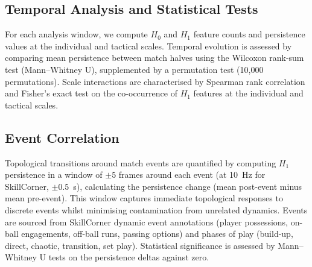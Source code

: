 \subsection{Temporal Analysis and Statistical Tests}

For each analysis window, we compute \(H_0\) and \(H_1\) feature counts and persistence values at the individual and tactical scales. Temporal evolution is assessed by comparing mean persistence between match halves using the Wilcoxon rank-sum test (Mann--Whitney U), supplemented by a permutation test (10,000 permutations). Scale interactions are characterised by Spearman rank correlation and Fisher's exact test on the co-occurrence of \(H_1\) features at the individual and tactical scales.

\subsection{Event Correlation}

Topological transitions around match events are quantified by computing \(H_1\) persistence in a window of \(\pm 5\) frames around each event (at 10~Hz for SkillCorner, \(\pm 0.5\)~s), calculating the persistence change (mean post-event minus mean pre-event). This window captures immediate topological responses to discrete events whilst minimising contamination from unrelated dynamics. Events are sourced from SkillCorner dynamic event annotations (player possessions, on-ball engagements, off-ball runs, passing options) and phases of play (build-up, direct, chaotic, transition, set play). Statistical significance is assessed by Mann--Whitney U tests on the persistence deltas against zero.
